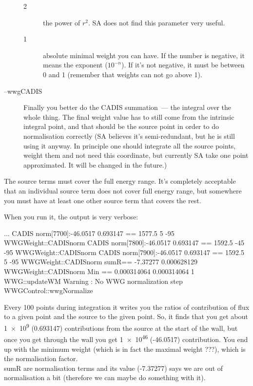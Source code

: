 \begin{description}
\begin{description}
  \item[2] the power of $r^2$. SA does not find this parameter very useful.
  \item[1] absolute minimal weight you can have. If the number is negative, it means the exponent ($10^{-n}$). If it's not negative, it must be between 0 and 1 (remember that weights can not go above 1).
  \end{description}
\item[--wwgCADIS] Finally you better do the CADIS summation~--- the integral over the whole thing. The final weight value has to still
  come from the intrinsic integral point, and that should be the source point in order to do normalisation correctly (SA believes it's semi-redundant, but he is still using it anyway. In principle one should integrate all the source points, weight them and not need this coordinate, but currently SA take one point approximated. It will be changed in the future.)
\end{description}

The source terms must cover the full energy range.
It's completely acceptable that an individual source term does not cover full energy range,
but somewhere you must have at least one other source term that covers the rest.

When you run it, the output is very verbose:
\begin{bash}
...
CADIS norm[7700]:-46.0517 0.693147 == 1577.5 5 -95          WWGWeight::CADISnorm
CADIS norm[7800]:-46.0517 0.693147 == 1592.5 -45 -95        WWGWeight::CADISnorm
CADIS norm[7900]:-46.0517 0.693147 == 1592.5 5 -95          WWGWeight::CADISnorm
sumR== -7.37277 0.000628129                                 WWGWeight::CADISnorm
Min == 0.000314064 0.000314064 1                                  WWG::updateWM
Warning : No WWG normalization step                        WWGControl::wwgNormalize
\end{bash}

Every 100 points during integration it writes you the ratios of contribution of flux to a given point and the source to the given point.
So, it finds that you get about
\num[retain-unity-mantissa=false]{1e9} (0.693147) 
contributions from the source at the start of the wall, but once you get through the wall you get
\num[retain-unity-mantissa=false]{1e46} (-46.0517) contribution.
You end up with the minimum weight (which is in fact the maximal weight \alert{???}), which is the normalisation factor. \\
sumR are normalisation terms and its value (-7.37277) says we are out of normalisation a bit (therefore we can maybe do something with it).

